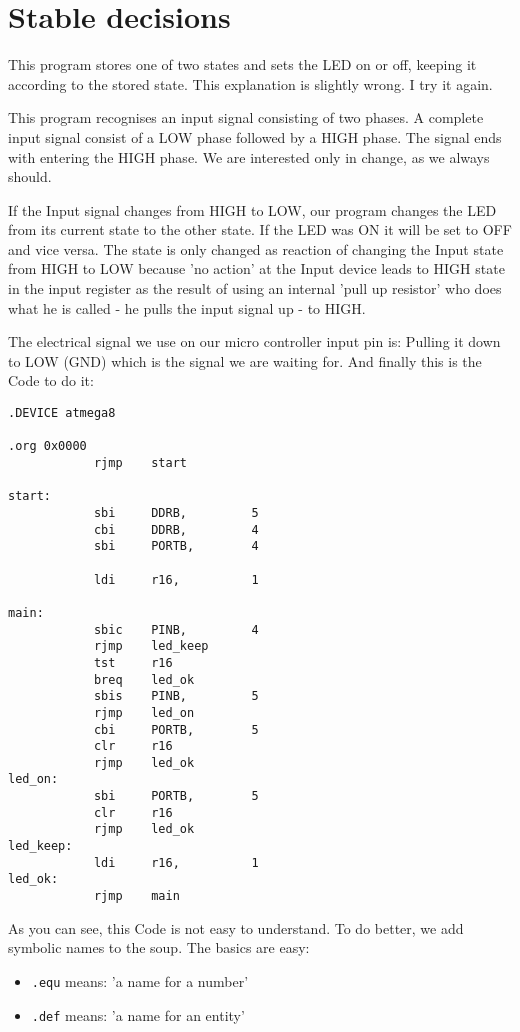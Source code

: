 \section{Stable decisions}

This program stores one of two states and sets the LED on or off, keeping it according to the stored state. This explanation is slightly wrong. I try it again.

This program recognises an input signal consisting of two phases. A complete input signal consist of a LOW phase followed by a HIGH phase. The signal ends with entering the HIGH phase. We are interested only in change, as we always should.

If the Input signal changes from HIGH to LOW, our program changes the LED from its current state to the other state. If the LED was ON it will be set to OFF and vice versa. The state is only changed as reaction of changing the Input state from HIGH to LOW because 'no action' at the Input device leads to HIGH state in the input register as the result of using an internal 'pull up resistor' who does what he is called - he pulls the input signal up - to HIGH.

The electrical signal we use on our micro controller input pin is: Pulling it down to LOW (GND) which is the signal we are waiting for. And finally this is the Code to do it:

\begin{lstlisting}
.DEVICE atmega8

.org 0x0000
            rjmp    start

start:
            sbi     DDRB,         5
            cbi     DDRB,         4
            sbi     PORTB,        4

            ldi     r16,          1

main:
            sbic    PINB,         4
            rjmp    led_keep
            tst     r16
            breq    led_ok
            sbis    PINB,         5
            rjmp    led_on
            cbi     PORTB,        5
            clr     r16
            rjmp    led_ok
led_on:
            sbi     PORTB,        5
            clr     r16
            rjmp    led_ok
led_keep:
            ldi     r16,          1
led_ok:
            rjmp    main
\end{lstlisting}


As you can see, this Code is not easy to understand. To do better, we add symbolic names to the soup. The basics are easy:

\begin{itemize}
  \item \texttt{.equ} means: 'a name for a number'
  \item \texttt{.def} means: 'a name for an entity'
\end{itemize}

